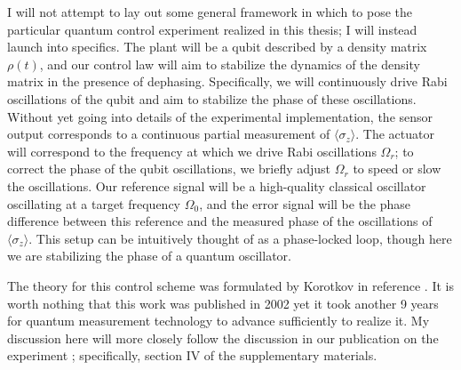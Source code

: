 I will not attempt to lay out some general framework in which to pose the particular quantum control experiment realized in this thesis; I will instead launch into specifics.  The plant will be a qubit described by a density matrix $\rho(t)$, and our control law will aim to stabilize the dynamics of the density matrix in the presence of dephasing.  Specifically, we will continuously drive Rabi oscillations of the qubit and aim to stabilize the phase of these oscillations.  Without yet going into details of the experimental implementation, the sensor output corresponds to a continuous partial measurement of $\langle \sigma_z \rangle$.  The actuator will correspond to the frequency at which we drive Rabi oscillations $\Omega_r$; to correct the phase of the qubit oscillations, we briefly adjust $\Omega_r$ to speed or slow the oscillations.  Our reference signal will be a high-quality classical oscillator oscillating at a target frequency $\Omega_0$, and the error signal will be the phase difference between this reference and the measured phase of the oscillations of $\langle \sigma_z \rangle$.  This setup can be intuitively thought of as a phase-locked loop, though here we are stabilizing the phase of a quantum oscillator.

The theory for this control scheme was formulated by Korotkov in reference \cite{korotkov_dir_fb}.  It is worth nothing that this work was published in 2002 yet it took another 9 years for quantum measurement technology to advance sufficiently to realize it.  My discussion here will more closely follow the discussion in our publication on the experiment \cite{vijay_stabilizing_2012}; specifically, section IV of the supplementary materials.

